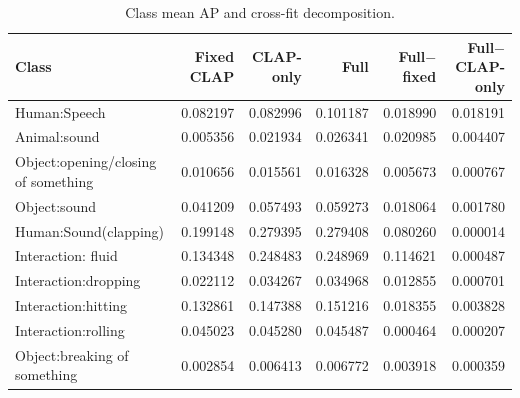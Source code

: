 \begin{table}[t]
\caption{Class mean AP and cross-fit decomposition.}
\centering
\scriptsize
\begin{tabular}{lrrrrr}
\toprule
Class & Fixed CLAP & CLAP-only & Full & Full$-$fixed & Full$-$CLAP-only\\
\midrule
Human:Speech & 0.082197 & 0.082996 & 0.101187 & 0.018990 & 0.018191\\
Animal:sound & 0.005356 & 0.021934 & 0.026341 & 0.020985 & 0.004407\\
Object:opening/closing of something & 0.010656 & 0.015561 & 0.016328 & 0.005673 & 0.000767\\
Object:sound & 0.041209 & 0.057493 & 0.059273 & 0.018064 & 0.001780\\
Human:Sound(clapping) & 0.199148 & 0.279395 & 0.279408 & 0.080260 & 0.000014\\
Interaction: fluid & 0.134348 & 0.248483 & 0.248969 & 0.114621 & 0.000487\\
Interaction:dropping & 0.022112 & 0.034267 & 0.034968 & 0.012855 & 0.000701\\
Interaction:hitting & 0.132861 & 0.147388 & 0.151216 & 0.018355 & 0.003828\\
Interaction:rolling & 0.045023 & 0.045280 & 0.045487 & 0.000464 & 0.000207\\
Object:breaking of something & 0.002854 & 0.006413 & 0.006772 & 0.003918 & 0.000359\\
\bottomrule
\end{tabular}
\end{table}
